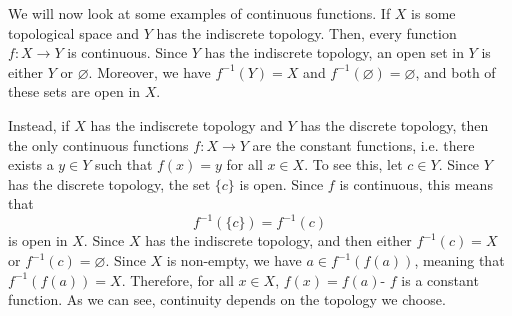 \documentclass[a4paper, openany]{memoir}
\theoremstyle{definition}
\theoremstyle{plain}
\begin{document}
We will now look at some examples of continuous functions. If $X$ is some topological space and $Y$ has the indiscrete topology. Then, every function $f: X \to Y$ is continuous. Since $Y$ has the indiscrete topology, an open set in $Y$ is either $Y$ or $\varnothing$. Moreover, we have $f^{-1}(Y) = X$ and $f^{-1}(\varnothing) = \varnothing$, and both of these sets are open in $X$. 

Instead, if $X$ has the indiscrete topology and $Y$ has the discrete topology, then the only continuous functions $f: X \to Y$ are the constant functions, i.e. there exists a $y \in Y$ such that $f(x) = y$ for all $x \in X$. To see this, let $c \in Y$. Since $Y$ has the discrete topology, the set $\{c\}$ is open. Since $f$ is continuous, this means that
\[f^{-1}(\{c\}) = f^{-1}(c)\]
is open in $X$. Since $X$ has the indiscrete topology, and then either $f^{-1}(c) = X$ or $f^{-1}(c) = \varnothing$. Since $X$ is non-empty, we have $a \in f^{-1}(f(a))$, meaning that $f^{-1}(f(a)) = X$. Therefore, for all $x \in X$, $f(x) = f(a)$- $f$ is a constant function. As we can see, continuity depends on the topology we choose.
\end{document}
